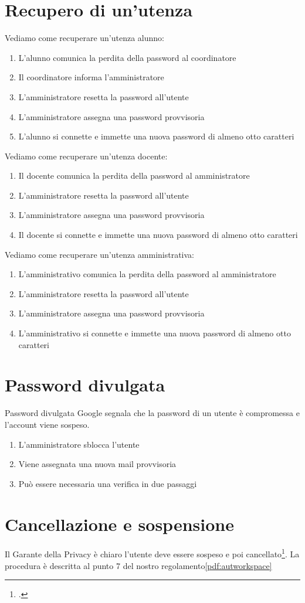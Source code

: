 \section{Recupero di un'utenza}
Vediamo come recuperare un'utenza alunno:
\begin{enumerate}
	\item L'alunno comunica la perdita della password al coordinatore
	\item Il coordinatore informa l'amministratore
	\item L'amministratore resetta la password all'utente
	\item L'amministratore assegna una password provvisoria 
	\item L'alunno si connette e immette una nuova password di almeno otto 
	caratteri 
\end{enumerate}
Vediamo come recuperare un'utenza docente:
\begin{enumerate}
	\item Il docente comunica la perdita della password al amministratore
	\item L'amministratore resetta la password all'utente
	\item L'amministratore assegna una password provvisoria 
	\item Il docente si connette e immette una nuova password di almeno otto 
	caratteri 
\end{enumerate}
Vediamo come recuperare un'utenza amministrativa:
\begin{enumerate}
	\item L'amministrativo comunica la perdita della password al amministratore
	\item L'amministratore resetta la password all'utente
	\item L'amministratore assegna una password provvisoria 
	\item L'amministrativo si connette e immette una nuova password di almeno 
	otto caratteri 
\end{enumerate}
\section{Password divulgata}
Password divulgata Google segnala che la password di un utente è compromessa e 
l'account viene sospeso.
\begin{enumerate}
	\item L'amministratore sblocca l'utente
	\item Viene assegnata una nuova mail provvisoria 
	\item Può essere necessaria una verifica in due passaggi
\end{enumerate}
\section{Cancellazione e sospensione}
Il Garante della Privacy è chiaro l'utente deve essere sospeso e 
poi cancellato\footcite{Garante2019}. La procedura è descritta al punto 7 del nostro regolamento\ref{pdf:autworkspace}
